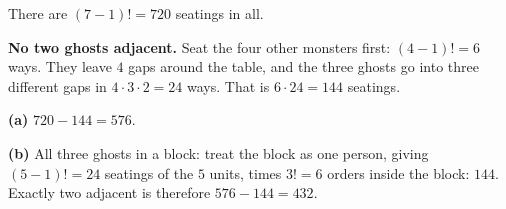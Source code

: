 There are $(7-1)!=720$ seatings in all.

\textbf{No two ghosts adjacent.} Seat the four other monsters first: $(4-1)!=6$ ways. They leave $4$ gaps around the table, and the three ghosts go into three different gaps in $4\cdot3\cdot2=24$ ways. That is $6\cdot24=144$ seatings.

\textbf{(a)} $720-144=\boxed{576}$.

\textbf{(b)} All three ghosts in a block: treat the block as one person, giving $(5-1)!=24$ seatings of the $5$ units, times $3!=6$ orders inside the block: $144$. Exactly two adjacent is therefore $576-144=\boxed{432}$.
